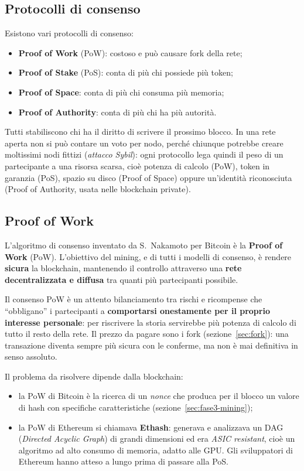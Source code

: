 \documentclass[a4paper, 11pt, oneside]{book}
\begin{document}
	\subsection{Protocolli di consenso}
	Esistono vari protocolli di consenso:
	\begin{itemize}
		\item \textbf{Proof of Work} (PoW): costoso e può causare fork della rete;
		\item \textbf{Proof of Stake} (PoS): conta di più chi possiede più token;
		\item \textbf{Proof of Space}: conta di più chi consuma più memoria;
		\item \textbf{Proof of Authority}: conta di più chi ha più autorità.
	\end{itemize}
	Tutti stabiliscono chi ha il diritto di scrivere il prossimo blocco. In una rete
	aperta non si può contare un voto per nodo, perché chiunque potrebbe creare
	moltissimi nodi fittizi (\textit{attacco Sybil}): ogni protocollo lega quindi il peso
	di un partecipante a una risorsa scarsa, cioè potenza di calcolo (PoW), token in
	garanzia (PoS), spazio su disco (Proof of Space) oppure un'identità riconosciuta
	(Proof of Authority, usata nelle blockchain private).

	\subsection{Proof of Work}\label{sec:pow}
	L'algoritmo di consenso inventato da S.~Nakamoto per Bitcoin è la \textbf{Proof of
	Work} (PoW). L'obiettivo del mining, e di tutti i modelli di consenso, è rendere
	\textbf{sicura} la blockchain, mantenendo il controllo attraverso una \textbf{rete
	decentralizzata e diffusa} tra quanti più partecipanti possibile.

	Il consenso PoW è un attento bilanciamento tra rischi e ricompense che ``obbligano''
	i partecipanti a \textbf{comportarsi onestamente per il proprio interesse
	personale}: per riscrivere la storia servirebbe più potenza di calcolo di tutto il
	resto della rete. Il prezzo da pagare sono i fork (sezione~\ref{sec:fork}): una
	transazione diventa sempre più sicura con le conferme, ma non è mai definitiva in
	senso assoluto.

	Il problema da risolvere dipende dalla blockchain:
	\begin{itemize}
		\item la PoW di Bitcoin è la ricerca di un \textit{nonce} che produca per il blocco
			un valore di hash con specifiche caratteristiche
			(sezione~\ref{sec:fase3-mining});
		\item la PoW di Ethereum si chiamava \textbf{Ethash}: generava e analizzava un
			DAG (\textit{Directed Acyclic Graph}) di grandi dimensioni ed era \textit{ASIC
			resistant}, cioè un algoritmo ad alto consumo di memoria, adatto alle GPU. Gli
			sviluppatori di Ethereum hanno atteso a lungo prima di passare alla PoS.
	\end{itemize}
\end{document}
